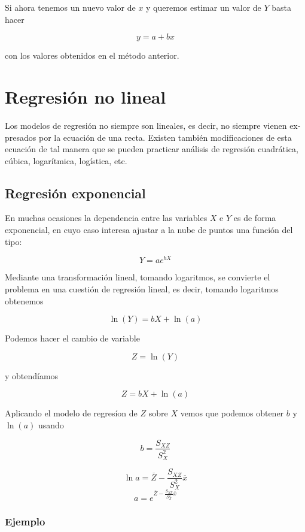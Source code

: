 \documentclass[]{book}
\theoremstyle{plain}
\theoremstyle{definition}
\begin{document}
Si ahora tenemos un nuevo valor de \(x\) y queremos estimar un valor de
\(Y\) basta hacer

\[y = a + b x\]

con los valores obtenidos en el método anterior.

\hypertarget{regresiuxf3n-no-lineal}{%
\section{Regresión no lineal}\label{regresiuxf3n-no-lineal}}

Los modelos de regresión no siempre son lineales, es decir, no siempre
vienen ex­presados por la ecuación de una recta. Existen también
modificaciones de esta ecuación de tal manera que se pueden practicar
análisis de regresión cuadrática, cúbica, logarít­mica, logística, etc.

\hypertarget{regresiuxf3n-exponencial}{%
\subsection{Regresión exponencial}\label{regresiuxf3n-exponencial}}

En muchas ocasiones la dependencia entre las variables \(X\) e \(Y\) es
de forma exponencial, en cuyo caso interesa ajustar a la nube de puntos
una función del tipo:

\[Y=ae^{bX}\]

Mediante una transformación lineal, tomando logaritmos, se convierte el
problema en una cuestión de regresión lineal, es decir, tomando
logaritmos obtenemos

\[\ln {(Y)}=bX+\ln {(a)}\]

Podemos hacer el cambio de variable

\[Z=\ln(Y)\]

y obtendíamos

\[Z = bX + \ln(a)\]

Aplicando el modelo de regresíon de \(Z\) sobre \(X\) vemos que podemos
obtener \(b\) y \(\ln(a)\) usando

\[b = \frac{S_{XZ}}{S^2_X}\]

\[\ln a = \overline{Z} - \frac{S_{XZ}}{S^2_X} \overline x\]
\[a = e^{ \overline{Z} - \frac{S_{XZ}}{S^2_X} \overline x}\]

\hypertarget{ejemplo-4}{%
\subsubsection{Ejemplo}\label{ejemplo-4}}
\end{document}
